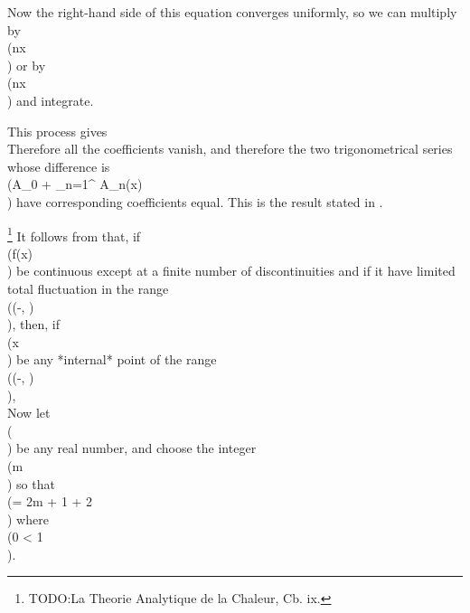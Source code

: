 Now the right-hand side of this equation converges uniformly, so we
can multiply by \\(\cos nx\\) or by \\(\sin nx\\) and integrate.

This process gives
\\[ \begin{align*}
  \pi n^{-2} \alpha_{n}
  =&
  - c' \! \int_{-\pi}^{\pi}\! \cos nx \, d x = 0,
  \\
  \pi n^{-2} b_{n}
  =&
  - c' \! \int_{-\pi}^{\pi}\! \sin nx \, d x = 0.
\end{align*} \\]
%
%
Therefore all the coefficients vanish, and therefore the two
trigonometrical series whose difference is
\\(A_{0} + \sum_{n=1}^{\infty} A_{n}(x)\\) have
corresponding coefficients equal.
This is the result stated in .

\footnote{TODO:La Theorie Analytique de la Chaleur, Cb. ix.}
It follows from  that, if \\(f(x)\\) be continuous except at a
finite number of discontinuities and if it have limited total
fluctuation in the range \\((-\infty, \infty)\\), then, if \\(x\\) be any
*internal* point of the range \\((-\alpha, \beta)\\),
\\[ 
\lim_{m \rightarrow \infty}
\int_{-\alpha}^{\beta}\!
\frac{\sin (2m + 1)(t - x)}{t - x}
f(t) \, d t
=
\lim_{\theta \rightarrow 0}
\frac{1}{2} \pi \theta^{-1} \sin \theta
\left\{
  f(x + 2\theta) + f(x - 2 \theta)
\right\}.
\\] 

Now let \\(\lambda\\) be any real number, and choose the integer \\(m\\) so that
\\(\lambda = 2m + 1 + 2\eta\\) where \\(0 \leq \eta < 1\\).

